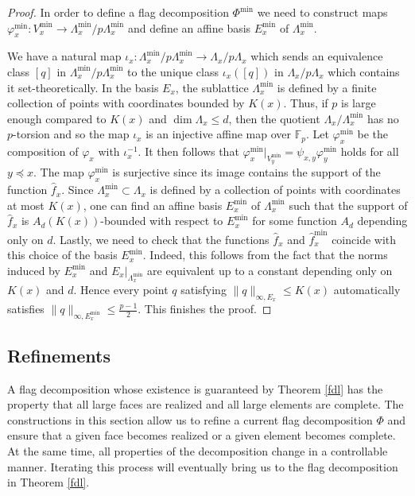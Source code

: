 \documentclass{daj}
\renewcommand{\le}{\leqslant}
\newcommand{\FF}{\mathbb F}
\theoremstyle{definition}
\theoremstyle{remark}
\theoremstyle{definition}
\theoremstyle{definition}
\begin{document}
\begin{proof}
In order to define a flag decomposition $\Phi^{\text{min}}$ we need to construct maps $\varphi^{\text{min}}_x: V^{\text{min}}_x \rightarrow \Lambda_x^{\text{min}} / p \Lambda_x^{\text{min}}$ and define an affine basis $E_x^{\text{min}}$ of $\Lambda_x^{\text{min}}$.

We have a natural map $\iota_x: \Lambda_x^{\text{min}}/p\Lambda^{\text{min}}_x \rightarrow \Lambda_x/p\Lambda_x$ which sends an equivalence class $[q]$ in $\Lambda_x^{\text{min}}/p\Lambda^{\text{min}}_x$ to the unique class $\iota_x([q])$ in $\Lambda_x/p\Lambda_x$ which contains it set-theoretically. In the basis $E_x$, the sublattice $\Lambda^{\text{min}}_x$ is defined by a finite collection of points with coordinates bounded by $K(x)$. Thus, if $p$ is large enough compared to $K(x)$ and $\dim \Lambda_x \le d$, then the quotient $\Lambda_x/\Lambda_x^{\text{min}}$ has no $p$-torsion and so the map $\iota_x$ is an injective affine map over $\FF_p$.
Let $\varphi_x^{\text{min}}$ be the composition of $\varphi_x$ with $\iota_x^{-1}$. It then follows that $\varphi^{\text{min}}_x|_{V_y^{\text{min}}} = \psi_{x, y}\varphi^{\text{min}}_y$ holds for all $y\preceq x$. The map $\varphi^{\text{min}}_x$ is surjective since its image contains the support of the function $\hat f_x$. Since $\Lambda_x^{\text{min}} \subset \Lambda_x$ is defined by a collection of points with coordinates at most $K(x)$, one can find an affine basis $E^{\text{min}}_x$ of $\Lambda_x^{\text{min}}$ such that the support of $\hat f_x$ is $A_d(K(x))$-bounded with respect to $E^{\text{min}}_x$ for some function $A_d$ depending only on $d$.
Lastly, we need to check that the functions $\hat f_x$ and $\hat f^{\text{min}}_x$ coincide with this choice of the basis $E^{\text{min}}_{x}$. Indeed, this follows from the fact that the norms induced by $E^{\text{min}}_x$ and $E_x|_{\Lambda_x^{\text{min}}}$ are equivalent up to a constant depending only on $K(x)$ and $d$. Hence every point $q$ satisfying $\|q\|_{\infty, E_x}\le K(x)$ automatically satisfies $\|q\|_{\infty, E_x^{\text{min}}} \le \frac{p-1}{2}$.
This finishes the proof.
\end{proof}

\subsection{Refinements}\label{fdl2}

A flag decomposition whose existence is guaranteed by Theorem \ref{fdl} has the property that all large faces are realized and all large elements are complete. The constructions in this section allow us to refine a current flag decomposition $\Phi$ and ensure that a given face becomes realized or a given element becomes complete. At the same time, all properties of the decomposition change in a controllable manner. Iterating this process will eventually bring us to the flag decomposition in Theorem \ref{fdl}.
\end{document}
